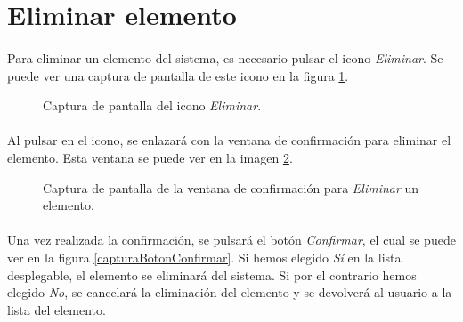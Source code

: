 \section{Eliminar elemento}

  \paragraph{}Para eliminar un elemento del sistema,  es necesario pulsar el
  icono \textit{Eliminar}. Se puede ver una captura de pantalla de este
  icono en la figura \ref{capturaDelElemento}.

  \begin{figure}[!ht]
    \begin{center}
      \caption{Captura de pantalla del icono \textit{Eliminar}.}
      \label{capturaDelElemento}
    \end{center}
  \end{figure}

  \paragraph{}Al pulsar en el icono, se enlazará con la ventana de confirmación
  para eliminar el elemento. Esta ventana se puede ver en la imagen
  \ref{capturaConfirmacion}.

  \begin{figure}[!ht]
    \begin{center}
      \caption{Captura de pantalla de la ventana de confirmación para \textit{Eliminar} un elemento.}
      \label{capturaConfirmacion}
    \end{center}
  \end{figure}

  \paragraph{}Una vez realizada la confirmación, se pulsará el botón
  \textit{Confirmar}, el cual se puede ver en la figura
  \ref{capturaBotonConfirmar}. Si hemos elegido \textit{Sí} en la lista
  desplegable, el elemento se eliminará del sistema. Si por el contrario hemos
  elegido \textit{No}, se cancelará la eliminación del elemento y se devolverá
  al usuario a la lista del elemento.
